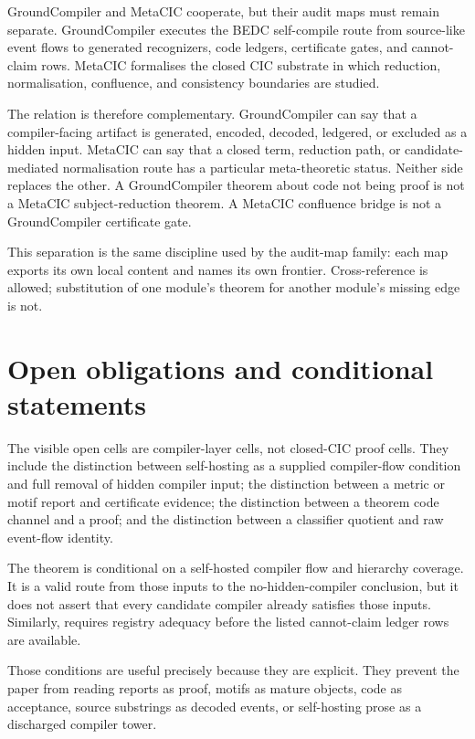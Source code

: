 GroundCompiler and MetaCIC cooperate, but their audit maps must remain
separate. GroundCompiler executes the BEDC self-compile route from source-like
event flows to generated recognizers, code ledgers, certificate gates, and
cannot-claim rows. MetaCIC formalises the closed CIC substrate in which
reduction, normalisation, confluence, and consistency boundaries are studied.

The relation is therefore complementary. GroundCompiler can say that a
compiler-facing artifact is generated, encoded, decoded, ledgered, or excluded
as a hidden input. MetaCIC can say that a closed term, reduction path, or
candidate-mediated normalisation route has a particular meta-theoretic status.
Neither side replaces the other. A GroundCompiler theorem about code not being
proof is not a MetaCIC subject-reduction theorem. A MetaCIC confluence bridge
is not a GroundCompiler certificate gate.

This separation is the same discipline used by the audit-map family: each map
exports its own local content and names its own frontier. Cross-reference is
allowed; substitution of one module's theorem for another module's missing
edge is not.

\section{Open obligations and conditional statements}
\label{sec:bedc-groundcompiler-audit-map-open-obligations}

The visible open cells are compiler-layer cells, not closed-CIC proof cells.
They include the distinction between self-hosting as a supplied compiler-flow
condition and full removal of hidden compiler input; the distinction between a
metric or motif report and certificate evidence; the distinction between a
theorem code channel and a proof; and the distinction between a classifier
quotient and raw event-flow identity.

The theorem
is conditional on a self-hosted compiler flow and hierarchy coverage. It is a
valid route from those inputs to the no-hidden-compiler conclusion, but it does
not assert that every candidate compiler already satisfies those inputs.
Similarly,
requires registry adequacy before the listed cannot-claim ledger rows are
available.

Those conditions are useful precisely because they are explicit. They prevent
the paper from reading reports as proof, motifs as mature objects, code as
acceptance, source substrings as decoded events, or self-hosting prose as a
discharged compiler tower.

